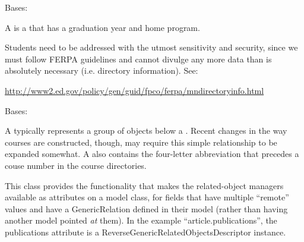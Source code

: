 \documentclass[letterpaper,10pt,english]{sphinxmanual}
\begin{document}

\begin{fulllineitems}
\label{generated/apps.profiles.models:apps.profiles.models.Student}
Bases: {\hyperref[generated/apps.profiles.models:apps.profiles.models.Person]{}}

A  is a  that has a graduation year and home program.

Students need to be addressed with the utmost sensitivity and security, since
we must follow FERPA guidelines and cannot divulge any more data than is
absolutely necessary (i.e. directory information).  See:

\href{http://www2.ed.gov/policy/gen/guid/fpco/ferpa/mndirectoryinfo.html}{http://www2.ed.gov/policy/gen/guid/fpco/ferpa/mndirectoryinfo.html}

\end{fulllineitems}



\begin{fulllineitems}
\label{generated/apps.profiles.models:apps.profiles.models.Subject}
Bases: {\hyperref[generated/apps.profiles.models:apps.profiles.models.BaseModel]{}}

A  typically represents a group of  objects below a
.  Recent changes in the way courses are constructed, though,
may require this simple relationship to be expanded somewhat.  A 
also contains the four-letter abbreviation that precedes a couse number
in the course directories.


\begin{fulllineitems}
\label{generated/apps.profiles.models:apps.profiles.models.Subject.unit_permissions}
This class provides the functionality that makes the related-object
managers available as attributes on a model class, for fields that have
multiple ``remote'' values and have a GenericRelation defined in their model
(rather than having another model pointed \emph{at} them). In the example
``article.publications'', the publications attribute is a
ReverseGenericRelatedObjectsDescriptor instance.

\end{fulllineitems}


\end{fulllineitems}
\end{document}
